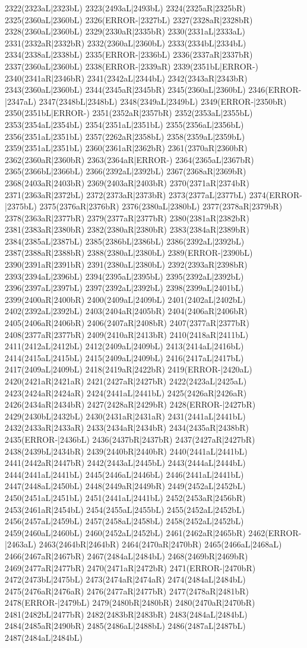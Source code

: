 2322(2323aL|2323bL) 2323(2493aL|2493bL) 2324(2325aR|2325bR) 2325(2360aL|2360bL) 2326(ERROR-|2327bL) 2327(2328aR|2328bR) 2328(2360aL|2360bL) 2329(2330aR|2335bR) 2330(2331aL|2333aL) 2331(2332aR|2332bR) 2332(2360aL|2360bL) 2333(2334bL|2334bL) 2334(2338aL|2338bL) 2335(ERROR-|2336bL) 2336(2337aR|2337bR) 2337(2360aL|2360bL) 2338(ERROR-|2339aR) 2339(2351bL|ERROR-) 2340(2341aR|2346bR) 2341(2342aL|2344bL) 2342(2343aR|2343bR) 2343(2360aL|2360bL) 2344(2345aR|2345bR) 2345(2360aL|2360bL) 2346(ERROR-|2347aL) 2347(2348bL|2348bL) 2348(2349aL|2349bL) 2349(ERROR-|2350bR) 2350(2351bL|ERROR-) 2351(2352aR|2357bR) 2352(2353aL|2355bL) 2353(2354aL|2354bL) 2354(2351aL|2351bL) 2355(2356aL|2356bL) 2356(2351aL|2351bL) 2357(2262aR|2358bL) 2358(2359aL|2359bL) 2359(2351aL|2351bL) 2360(2361aR|2362bR) 2361(2370aR|2360bR) 2362(2360aR|2360bR) 2363(2364aR|ERROR-) 2364(2365aL|2367bR) 2365(2366bL|2366bL) 2366(2392aL|2392bL) 2367(2368aR|2369bR) 2368(2403aR|2403bR) 2369(2403aR|2403bR) 2370(2371aR|2374bR) 2371(2363aR|2372bL) 2372(2373aR|2373bR) 2373(2377aL|2377bL) 2374(ERROR-|2375bL) 2375(2376aR|2376bR) 2376(2380aL|2380bL) 2377(2378aR|2379bR) 2378(2363aR|2377bR) 2379(2377aR|2377bR) 2380(2381aR|2382bR) 2381(2383aR|2380bR) 2382(2380aR|2380bR) 2383(2384aR|2389bR) 2384(2385aL|2387bL) 2385(2386bL|2386bL) 2386(2392aL|2392bL) 2387(2388aR|2388bR) 2388(2380aL|2380bL) 2389(ERROR-|2390bL) 2390(2391aR|2391bR) 2391(2380aL|2380bL) 2392(2393aR|2398bR) 2393(2394aL|2396bL) 2394(2395aL|2395bL) 2395(2392aL|2392bL) 2396(2397aL|2397bL) 2397(2392aL|2392bL) 2398(2399aL|2401bL) 2399(2400aR|2400bR) 2400(2409aL|2409bL) 2401(2402aL|2402bL) 2402(2392aL|2392bL) 2403(2404aR|2405bR) 2404(2406aR|2406bR) 2405(2406aR|2406bR) 2406(2407aR|2408bR) 2407(2377aR|2377bR) 2408(2377aR|2377bR) 2409(2410aR|2413bR) 2410(2418aR|2411bL) 2411(2412aL|2412bL) 2412(2409aL|2409bL) 2413(2414aL|2416bL) 2414(2415aL|2415bL) 2415(2409aL|2409bL) 2416(2417aL|2417bL) 2417(2409aL|2409bL) 2418(2419aR|2422bR) 2419(ERROR-|2420aL) 2420(2421aR|2421aR) 2421(2427aR|2427bR) 2422(2423aL|2425aL) 2423(2424aR|2424aR) 2424(2441aL|2441bL) 2425(2426aR|2426aR) 2426(2434aR|2434bR) 2427(2428aR|2429bR) 2428(ERROR-|2427bR) 2429(2430bL|2432bL) 2430(2431aR|2431aR) 2431(2441aL|2441bL) 2432(2433aR|2433aR) 2433(2434aR|2434bR) 2434(2435aR|2438bR) 2435(ERROR-|2436bL) 2436(2437bR|2437bR) 2437(2427aR|2427bR) 2438(2439bL|2434bR) 2439(2440bR|2440bR) 2440(2441aL|2441bL) 2441(2442aR|2447bR) 2442(2443aL|2445bL) 2443(2444aL|2444bL) 2444(2441aL|2441bL) 2445(2446aL|2446bL) 2446(2441aL|2441bL) 2447(2448aL|2450bL) 2448(2449aR|2449bR) 2449(2452aL|2452bL) 2450(2451aL|2451bL) 2451(2441aL|2441bL) 2452(2453aR|2456bR) 2453(2461aR|2454bL) 2454(2455aL|2455bL) 2455(2452aL|2452bL) 2456(2457aL|2459bL) 2457(2458aL|2458bL) 2458(2452aL|2452bL) 2459(2460aL|2460bL) 2460(2452aL|2452bL) 2461(2462aR|2465bR) 2462(ERROR-|2463aL) 2463(2464bR|2464bR) 2464(2470aR|2470bR) 2465(2466aL|2468aL) 2466(2467aR|2467bR) 2467(2484aL|2484bL) 2468(2469bR|2469bR) 2469(2477aR|2477bR) 2470(2471aR|2472bR) 2471(ERROR-|2470bR) 2472(2473bL|2475bL) 2473(2474aR|2474aR) 2474(2484aL|2484bL) 2475(2476aR|2476aR) 2476(2477aR|2477bR) 2477(2478aR|2481bR) 2478(ERROR-|2479bL) 2479(2480bR|2480bR) 2480(2470aR|2470bR) 2481(2482bL|2477bR) 2482(2483bR|2483bR) 2483(2484aL|2484bL) 2484(2485aR|2490bR) 2485(2486aL|2488bL) 2486(2487aL|2487bL) 2487(2484aL|2484bL) 